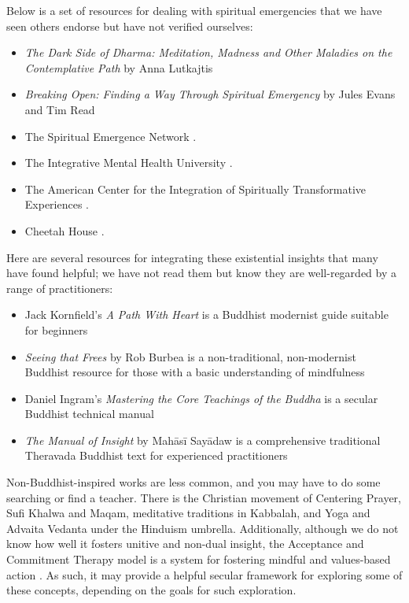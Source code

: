 \documentclass[12pt,letterpaper]{book}
\begin{document}
Below is a set of resources for dealing with spiritual emergencies that we have seen others endorse but have not verified ourselves:
\begin{itemize}
    \item \textit{The Dark Side of Dharma: Meditation, Madness and Other Maladies on the Contemplative Path} by Anna Lutkajtis \cite{lutkajtis2021dark}
    \item \textit{Breaking Open: Finding a Way Through Spiritual Emergency} by Jules Evans and Tim Read \cite{evans2020}
    \item The Spiritual Emergence Network \cite{sen}.
    \item The Integrative Mental Health University \cite{imhu}.
    \item The American Center for the Integration of Spiritually Transformative Experiences \cite{aciste}.
    \item Cheetah House \cite{cheetahHouse}.
\end{itemize}

Here are several resources for integrating these existential insights that many have found helpful; we have not read them but know they are well-regarded by a range of practitioners:
\begin{itemize}
    \item Jack Kornfield's \textit{A Path With Heart} is a Buddhist modernist guide suitable for beginners \cite{kornfield1993path}
    \item \textit{Seeing that Frees} by Rob Burbea is a non-traditional, non-modernist Buddhist resource for those with a basic understanding of mindfulness \cite{burbea2014seeing}
    \item Daniel Ingram's \textit{Mastering the Core Teachings of the Buddha} is a secular Buddhist technical manual \cite{ingram2018mastering}
    \item \textit{The Manual of Insight} by Mahāsī Sayādaw is a comprehensive traditional Theravada Buddhist text for experienced practitioners \cite{sayadaw2016manual}
\end{itemize}
Non-Buddhist-inspired works are less common, and you may have to do some searching or find a teacher. There is the Christian movement of Centering Prayer, Sufi Khalwa and Maqam, meditative traditions in Kabbalah, and Yoga and Advaita Vedanta under the Hinduism umbrella. Additionally, although we do not know how well it fosters unitive and non-dual insight, the Acceptance and Commitment Therapy model is a system for fostering mindful and values-based action \cite{actSimple}. As such, it may provide a helpful secular framework for exploring some of these concepts, depending on the goals for such exploration.
\end{document}

